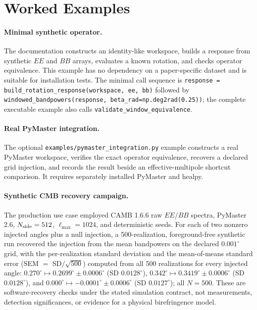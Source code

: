 \documentclass[11pt]{article}
\begin{document}
\section{Worked Examples}
\label{sec:worked-examples}

\paragraph{Minimal synthetic operator.}
The documentation constructs an identity-like workspace, builds a response
from synthetic \(EE\) and \(BB\) arrays, evaluates a known rotation, and checks
operator equivalence.  This example has no dependency on a paper-specific
dataset and is suitable for installation tests.
The minimal call sequence is
\texttt{response = build\_rotation\_response(workspace, ee, bb)} followed by
\texttt{windowed\_bandpowers(response, beta\_rad=np.deg2rad(0.25))}; the complete executable
example also calls \texttt{validate\_window\_equivalence}.

\paragraph{Real PyMaster integration.}
The optional \nolinkurl{examples/pymaster_integration.py} example constructs a
real PyMaster workspace, verifies the exact operator equivalence, recovers a
declared grid injection, and records the result beside an effective-multipole
shortcut comparison. It requires separately installed PyMaster and healpy.

\paragraph{Synthetic CMB recovery campaign.}
The production use case employed CAMB 1.6.6 raw \(EE/BB\) spectra, PyMaster
2.6, \(N_{\rm side}=512\), \(\ell_{\max}=1024\), and deterministic seeds.
For each of two nonzero injected angles plus a null injection, a
500-realization, foreground-free synthetic run recovered the injection from
the mean bandpowers on the declared \(0.001^\circ\) grid, with the
per-realization standard deviation and the mean-of-means standard error
(SEM \(=\) SD\(/\sqrt{500}\)) computed from all 500 realizations for every
injected angle: \(0.270^\circ\mapsto0.2699^\circ\pm0.0006^\circ\) (SD
\(0.0128^\circ\)), \(0.342^\circ\mapsto0.3419^\circ\pm0.0006^\circ\) (SD
\(0.0128^\circ\)), and \(0.000^\circ\mapsto-0.0001^\circ\pm0.0006^\circ\)
(SD \(0.0127^\circ\)); all \(N=500\).  These are software-recovery checks under the stated
simulation contract, not measurements, detection significances, or evidence
for a physical birefringence model.
\end{document}
